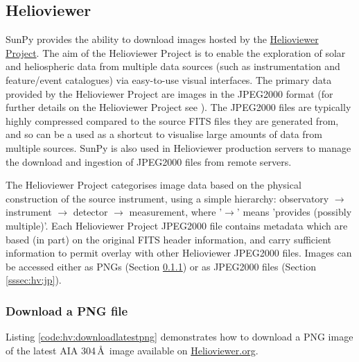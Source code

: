 \subsection{Helioviewer}\label{ssec:hv}

SunPy provides the ability to download images hosted by the
\href{http://helioviewer.org}{Helioviewer Project}.  
The aim of the Helioviewer Project is to enable
the exploration of solar and heliospheric data from multiple data
sources (such as instrumentation and feature/event catalogues) via
easy-to-use visual interfaces.  The primary data provided by the
Helioviewer Project are images in the JPEG2000 format (for further
details on the Helioviewer Project see \cite{muller2009}). The
JPEG2000 files are typically highly compressed compared to the source
FITS files they are generated from, and so can be a used as a shortcut
to visualise large amounts of data from multiple sources.  SunPy is
also used in Helioviewer production servers to manage the download and
ingestion of JPEG2000 files from remote servers.

The Helioviewer Project categorises image data based on the physical
construction of the source instrument, using a simple hierarchy:
observatory $\rightarrow$ instrument $\rightarrow$ detector
$\rightarrow$ measurement, where '$\rightarrow$' means 'provides
(possibly multiple)'.  Each Helioviewer Project JPEG2000 file contains
metadata which are based (in part) on the original FITS header
information, and carry sufficient information to permit overlay with
other Helioviewer JPEG2000 files. Images can be accessed either as
PNGs (Section \ref{sssec:hv:png}) or as JPEG2000 files (Section
\ref{sssec:hv:jp}).

\subsubsection{Download a PNG file}\label{sssec:hv:png}


Listing \ref{code:hv:downloadlatestpng} demonstrates how to download a
PNG image of the latest AIA 304$\,$\AA\ image available on
\url{Helioviewer.org}.

